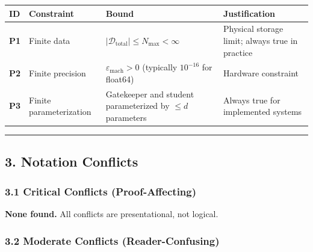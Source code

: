 \documentclass[
  12pt,
]{ctexart}
\begin{document}
\begin{longtable}[]{@{}
  >{\raggedright\arraybackslash}p{}
  >{\raggedright\arraybackslash}p{}
  >{\raggedright\arraybackslash}p{}
  >{\raggedright\arraybackslash}p{}@{}}
\toprule\noalign{}
\begin{minipage}[b]{\linewidth}\raggedright
ID
\end{minipage} & \begin{minipage}[b]{\linewidth}\raggedright
Constraint
\end{minipage} & \begin{minipage}[b]{\linewidth}\raggedright
Bound
\end{minipage} & \begin{minipage}[b]{\linewidth}\raggedright
Justification
\end{minipage} \\
\midrule\noalign{}
\endhead
\bottomrule\noalign{}
\endlastfoot
\textbf{P1} & Finite data &
\(|\mathcal{D}_{\text{total}}| \leq N_{\max} < \infty\) & Physical
storage limit; always true in practice \\
\textbf{P2} & Finite precision & \(\varepsilon_{\text{mach}} > 0\)
(typically \(10^{-16}\) for float64) & Hardware constraint \\
\textbf{P3} & Finite parameterization & Gatekeeper and student
parameterized by \(\leq d\) parameters & Always true for implemented
systems \\
\end{longtable}

\begin{center}\rule{0.5\linewidth}{0.5pt}\end{center}

\subsection{3. Notation Conflicts}\label{notation-conflicts}

\subsubsection{3.1 Critical Conflicts
(Proof-Affecting)}\label{critical-conflicts-proof-affecting}

\textbf{None found.} All conflicts are presentational, not logical.

\subsubsection{3.2 Moderate Conflicts
(Reader-Confusing)}\label{moderate-conflicts-reader-confusing}
\end{document}
